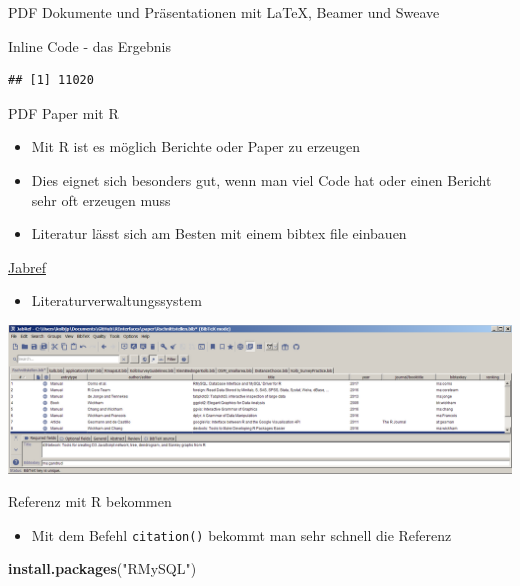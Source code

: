 \documentclass[ignorenonframetext,]{beamer}
\newenvironment{Shaded}{}{}
\newcommand{\KeywordTok}[1]{\textcolor[rgb]{0.00,0.44,0.13}{\textbf{{#1}}}}
\newcommand{\StringTok}[1]{\textcolor[rgb]{0.25,0.44,0.63}{{#1}}}
\newcommand{\NormalTok}[1]{{#1}}
\providecommand{\tightlist}{%
\setlength{\itemsep}{0pt}\setlength{\parskip}{0pt}}
\begin{document}
\begin{frame}[fragile]{PDF Dokumente und Präsentationen mit LaTeX,
Beamer und Sweave}
\begin{block}{Inline Code - das Ergebnis}
\begin{verbatim}
## [1] 11020
\end{verbatim}

\end{block}

\begin{block}{PDF Paper mit R}

\begin{itemize}
\tightlist
\item
  Mit R ist es möglich Berichte oder Paper zu erzeugen
\item
  Dies eignet sich besonders gut, wenn man viel Code hat oder einen
  Bericht sehr oft erzeugen muss
\item
  Literatur lässt sich am Besten mit einem bibtex file einbauen
\end{itemize}

\end{block}

\begin{block}{\href{http://www.jabref.org/}{Jabref}}

\begin{itemize}
\tightlist
\item
  Literaturverwaltungssystem
\end{itemize}

\includegraphics{./tex2pdf.9796/f7708c0137b8eac5334a7a7a7e25e099dda4cc26.png}

\end{block}

\begin{block}{Referenz mit R bekommen}

\begin{itemize}
\tightlist
\item
  Mit dem Befehl \texttt{citation()} bekommt man sehr schnell die
  Referenz
\end{itemize}

\begin{Shaded}
\begin{Highlighting}[]
\KeywordTok{install.packages}\NormalTok{(}\StringTok{"RMySQL"}\NormalTok{)}
\end{Highlighting}
\end{Shaded}


\end{block}
\end{frame}
\end{document}
